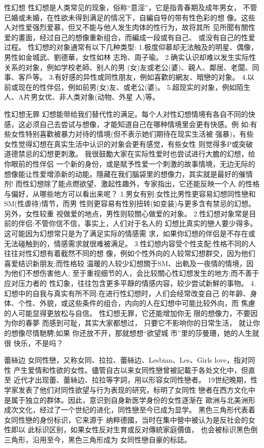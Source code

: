\documentclass[12pt,UTF8]{ctexbook}
\begin{document}
性幻想
性幻想是人类常见的现象，俗称“意淫”，它是指青春期及成年男女，
不管已婚或未婚，在性欲未得到满足的情况下，自編自导的带有性色彩的想
像。这些人对性爱强烈爱慕，但又不能与他人发生肉体的性行为，故将其所
见所聞有關性爱的畫面，经过自己的想像重新组合，而編成一段或有自己、
或没有自己的性爱过程。
性幻想的对象通常有以下几种类型:
1.极度仰慕却无法触及的明星、偶像，男性如金城武、劉德華，女性如林
志玲、周子瑜。
2.确实认识却难以发生实际性关系的对象，例如学校老師、别人的男
(女)友或老公(婆)、親人、鄰居、老闆、同事、客戶等。
3.有好感的异性或同性朋友，例如喜歡的網友、暗戀的对象。
4.以前或现在的性伴侣，例如前男(女)友、或老公(婆)。
5.超现实的对象，例如陌生人、A片男女优、非人类对象(动物、外星
人)等。

性幻想无罪
幻想能带给我们替代性的满足。每个人对性幻想情境有各自不同的快
感，这必须自己去尝试与想像，才能知道自己在哪种情境里会更有快感。例
如:有些女性特别喜歡被暴力对待的情境(但不表示她们期待在现实生活被
强暴)，有些女性觉得幻想在真实生活中认识的对象会更有感觉，有些女性
则觉得多P或突破道德禁忌的幻想更刺激。
我很鼓勵大家在实际性爱时也尝试进行大膽的幻想，给你眼前的性伴侣
一个新的身份，或是賦予性爱一个刺激的故事情境，无边无际的想像能让性爱增添新的动能。隱藏在我们腦袋里的想像力，其实就是最好的催情剂!
而性幻想除了能点燃欲望、激起性趣外，专家指出，它还能反映一个人
的性格与偏好，从哪些地方可以看出来呢？
1.男女有别:女性比男性更容易幻想同性戀和SM(性虐待)情节，而男
性则更容易有性别扭转(如变装)与更多含有禁忌的幻想。另外，女性较重
视做爱的地点，男性则较關心做爱的对象。
2.性幻想对象常是目前的伴侣:不管你信不信，事实上，人们对于名人的
幻想比真实的戀人要少得多。这可能因为幻想常只是为了满足实际的情感需
求，如果你幻想的伴侣是不存在或无法碰触到的，情感需求就很难被满足。
3.性幻想内容受个性支配:性格不同的人往往对性幻想有着截然不同的想
像，例如个性外向的人较常幻想群交，因为他们喜爱结识新朋友;而性格较
温暖的人较少幻想關于SM、出軌及一夜情的情境，因为他们不想伤害他人;
至于重视细节的人，会比较關心性幻想发生的地方;而不善于应对压力者的
性幻象，往往包含更多平靜的情感内容，较少尝试新鮮的事物。
4.幻想中的自我与真实有所不同:在进行性幻想时，人们会经常改变自己
的年齡、身体、个性、外貌，或这些条件的组合，内向的人在幻想中可能比较外向，而
焦慮的人可能显得更放松与自信。
性幻想无罪，它还能增加你无
限的想像力，不要因为你的春夢
而感到可耻，其实大家都想过，
只要它不影响你的日常生活，
就让你的想像尽情馳騁;如果
你还放不开，那就想想“欲望城
市”里的莎曼珊，她的人生就很
快乐，不是吗？

蕾絲边
女同性戀，又称女同、拉拉、蕾絲边、Lesbian、Les、Girls love，指对同性
产生爱情和性欲的女性。儘管自古以来女同性戀曾被記載于各处文化中，但直至
近代才出现蕾、蕾絲边、拉拉等字詞，用以形容女同性戀者。
19世纪晚期，性学家发表了他们对同性欲望与行为表现的研究，标明了女同性
戀者在西方文化中是属于独立的群体。因此，意识到自身新医学身份的女性逐渐在
歐洲与北美洲形成次文化，经过了一个世纪的进化，同性戀至今已成为显学。
黑色三角形代表着女同性戀的身份标识，它来源于
纳粹德國，当时在集中營中被认为是反社会的女性即以
此标识区别，如果女性反对生育或反对傳統家庭價值，
也会被标识黑色倒三角形，沿用至今，黑色三角形成为
女同性戀自豪的标誌。
\end{document}
